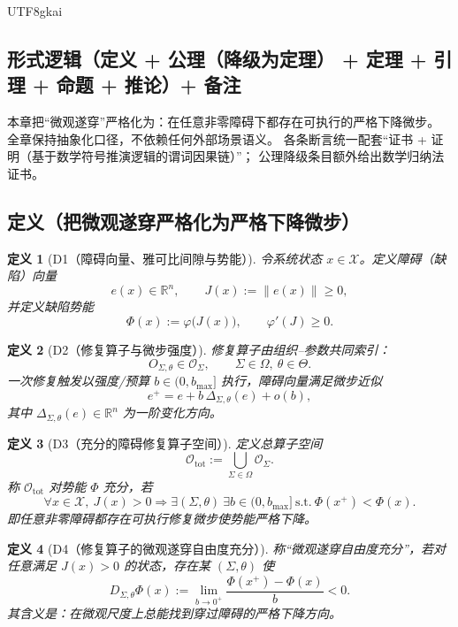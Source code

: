 \documentclass[12pt]{article}
\newtheorem{definition}{定义}[section]
\newcommand{\RR}{\mathbb{R}}
\begin{document}
\begin{CJK*}{UTF8}{gkai}
\subsection{形式逻辑（定义 + 公理（降级为定理） + 定理 + 引理 + 命题 + 推论）+ 备注}
\label{subsec:tex28-ch10-logic-structure}

本章把“微观遂穿”严格化为：在任意非零障碍下都存在可执行的严格下降微步。
全章保持抽象化口径，不依赖任何外部场景语义。
各条断言统一配套“证书 + 证明（基于数学符号推演逻辑的谓词因果链）”；
公理降级条目额外给出数学归纳法证书。

\subsection{定义（把微观遂穿严格化为严格下降微步）}
\label{subsec:tex28-ch10-defs}

\begin{definition}[D1（障碍向量、雅可比间隙与势能）]
\label{def:tex28-ch10-d1}
令系统状态 $x\in\mathcal{X}$。定义障碍（缺陷）向量
\[
  e(x)\in\RR^n,\qquad J(x):=\|e(x)\|\ge 0,
\]
并定义缺陷势能
\[
  \Phi(x):=\varphi\bigl(J(x)\bigr),
  \qquad
  \varphi'(J)\ge 0.
\]
\end{definition}

\begin{definition}[D2（修复算子与微步强度）]
\label{def:tex28-ch10-d2}
修复算子由组织--参数共同索引：
\[
  O_{\Sigma,\theta}\in\mathcal{O}_{\Sigma},
  \qquad
  \Sigma\in\Omega,\ \theta\in\Theta.
\]
一次修复触发以强度/预算 $b\in(0,b_{\max}]$ 执行，障碍向量满足微步近似
\[
  e^{+}=e+b\,\Delta_{\Sigma,\theta}(e)+o(b),
\]
其中 $\Delta_{\Sigma,\theta}(e)\in\RR^n$ 为一阶变化方向。
\end{definition}

\begin{definition}[D3（充分的障碍修复算子空间）]
\label{def:tex28-ch10-d3}
定义总算子空间
\[
  \mathcal{O}_{\mathrm{tot}}:=\bigcup_{\Sigma\in\Omega}\mathcal{O}_{\Sigma}.
\]
称 $\mathcal{O}_{\mathrm{tot}}$ 对势能 $\Phi$ 充分，若
\[
  \forall x\in\mathcal{X},\ J(x)>0
  \Rightarrow
  \exists (\Sigma,\theta)\ \exists b\in(0,b_{\max}]
  \ \text{s.t.}\ \Phi(x^{+})<\Phi(x).
\]
即任意非零障碍都存在可执行修复微步使势能严格下降。
\end{definition}

\begin{definition}[D4（修复算子的微观遂穿自由度充分）]
\label{def:tex28-ch10-d4}
称“微观遂穿自由度充分”，若对任意满足 $J(x)>0$ 的状态，存在某 $(\Sigma,\theta)$ 使
\[
  D_{\Sigma,\theta}\Phi(x)
  :=\lim_{b\to0^+}\frac{\Phi(x^{+})-\Phi(x)}{b}<0.
\]
其含义是：在微观尺度上总能找到穿过障碍的严格下降方向。
\end{definition}


\end{CJK*}
\end{document}
